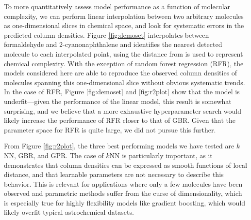 \documentclass[twocolumn]{aastex63}
\begin{document}
To more quantitatively assess model performance as a function of molecular complexity, we can perform linear interpolation between two arbitrary molecules as one-dimensional slices in chemical space, and look for systematic errors in the predicted column densities. Figure \ref{fig:demoset} interpolates between formaldehyde and 2-cyanonaphthalene and identifies the nearest detected molecule to each interpolated point, using the distance from  is used to represent chemical complexity. With the exception of random forest regression (RFR), the models considered here are able to reproduce the observed column densities of molecules spanning this one-dimensional slice without obvious systematic trends. In the case of RFR, Figure \ref{fig:demoset} and \ref{fig:r2plot} show that the model is underfit---given the performance of the linear model, this result is somewhat surprising, and we believe that a more exhaustive hyperparameter search would likely increase the performance of RFR closer to that of GBR. Given that the parameter space for RFR is quite large, we did not pursue this further.

From Figure \ref{fig:r2plot}, the three best performing models we have tested are $k$NN, GBR, and GPR. The case of $k$NN is particularly important, as it demonstrates that column densities can be expressed as smooth functions of local distance, and that learnable parameters are not necessary to describe this behavior. This is relevant for applications where only a few molecules have been observed and parametric methods suffer from the curse of dimensionality, which is especially true for highly flexibility models like gradient boosting, which would likely overfit typical astrochemical datasets.
\end{document}
